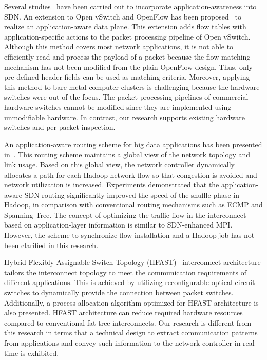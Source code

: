 Several studies~\autocites{Mekky2014}{Cheng2014} have been carried out
to incorporate application-awareness into SDN\@. An extension to Open
vSwitch and OpenFlow has been proposed~\autocite{Mekky2014} to realize
an application-aware data plane. This extension adds flow tables with
application-specific actions to the packet processing pipeline of Open
vSwitch. Although this method covers most network applications, it is
not able to efficiently read and process the payload of a packet because
the flow matching mechanism has not been modified from the plain
OpenFlow design. Thus, only pre-defined header fields can be used as
matching criteria. Moreover, applying this method to bare-metal computer
clusters is challenging because the hardware switches were out of the
focus. The packet processing pipelines of commercial hardware switches
cannot be modified since they are implemented using unmodifiable
hardware. In contrast, our research supports existing hardware switches
and per-packet inspection.

An application-aware routing scheme for big data applications has been
presented in~\autocite{Cheng2014}. This routing scheme maintains a
global view of the network topology and link usage. Based on this global
view, the network controller dynamically allocates a path for each
Hadoop network flow so that congestion is avoided and network
utilization is increased. Experiments demonstrated that the
application-aware SDN routing significantly improved the speed of the
shuffle phase in Hadoop, in comparison with conventional routing
mechanisms such as ECMP and Spanning Tree. The concept of optimizing the
traffic flow in the interconnect based on application-layer information
is similar to SDN-enhanced MPI\@. However, the scheme to synchronize flow
installation and a Hadoop job has not been clarified in this research.

Hybrid Flexibly Assignable Switch Topology (HFAST)~\autocite{Kamil2007}
interconnect architecture tailors the interconnect topology to meet the
communication requirements of different applications. This is achieved
by utilizing reconfigurable optical circuit switches to dynamically
provide the connection between packet switches. Additionally, a process
allocation algorithm optimized for HFAST architecture is also presented.
HFAST architecture can reduce required hardware resources compared to
conventional fat-tree interconnects. Our research is different from this
research in terms that a technical design to extract communication
patterns from applications and convey such information to the network
controller in real-time is exhibited.

